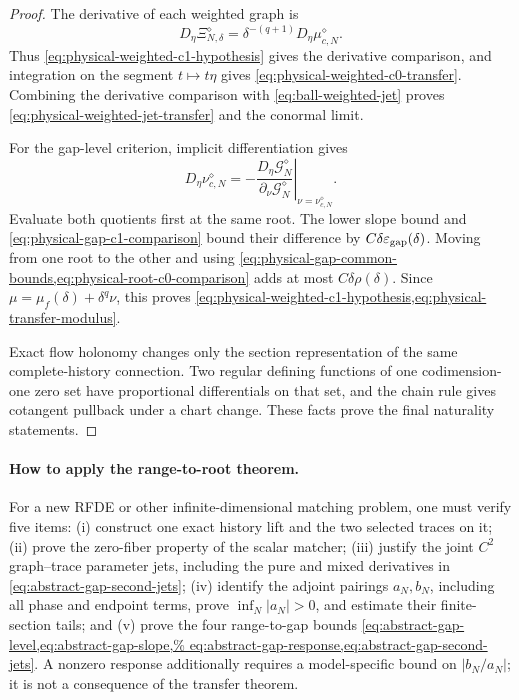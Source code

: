 \begin{proof}
The derivative of each weighted graph is
\[
 D_\eta\Xi^\diamond_{N,\delta}
 =\delta^{-(q+1)}D_\eta\mu^\diamond_{c,N}.
\]
Thus \cref{eq:physical-weighted-c1-hypothesis} gives the derivative
comparison, and integration on the segment \(t\mapsto t\eta\) gives
\cref{eq:physical-weighted-c0-transfer}.  Combining the derivative comparison
with \cref{eq:ball-weighted-jet} proves
\cref{eq:physical-weighted-jet-transfer} and the conormal limit.

For the gap-level criterion, implicit differentiation gives
\[
 D_\eta\nu^\diamond_{c,N}
 =-\left.
   \frac{D_\eta\mathscr G_N^\diamond}
        {\partial_\nu\mathscr G_N^\diamond}
   \right|_{\nu=\nu^\diamond_{c,N}}.
\]
Evaluate both quotients first at the same root.  The lower slope bound and
\cref{eq:physical-gap-c1-comparison} bound their difference by
\(C\delta\varepsilon_{\rm gap}(\delta)\).  Moving from one root to the other
and using \cref{eq:physical-gap-common-bounds,eq:physical-root-c0-comparison}
adds at most \(C\delta\rho(\delta)\).  Since
\(\mu=\mu_f(\delta)+\delta^q\nu\), this proves
\cref{eq:physical-weighted-c1-hypothesis,eq:physical-transfer-modulus}.

Exact flow holonomy changes only the section representation of the same
complete-history connection.  Two regular defining functions of one
codimension-one zero set have proportional differentials on that set, and
the chain rule gives cotangent pullback under a chart change.  These facts
prove the final naturality statements.
\end{proof}

\paragraph{How to apply the range-to-root theorem.}
For a new RFDE or other infinite-dimensional matching problem, one must
verify five items: (i) construct one exact history lift and the two selected
traces on it; (ii) prove the zero-fiber property of the scalar matcher;
(iii) justify the joint \(C^2\) graph--trace parameter jets, including the
pure and mixed derivatives in \cref{eq:abstract-gap-second-jets};
(iv) identify the adjoint pairings \(a_N,b_N\), including all phase and
endpoint terms, prove
\(\inf_N|a_N|>0\), and estimate their finite-section tails; and (v) prove
the four range-to-gap bounds
\cref{eq:abstract-gap-level,eq:abstract-gap-slope,%
eq:abstract-gap-response,eq:abstract-gap-second-jets}.  A nonzero response
additionally requires a model-specific bound on \(|b_N/a_N|\); it is not a
consequence of the transfer theorem.

